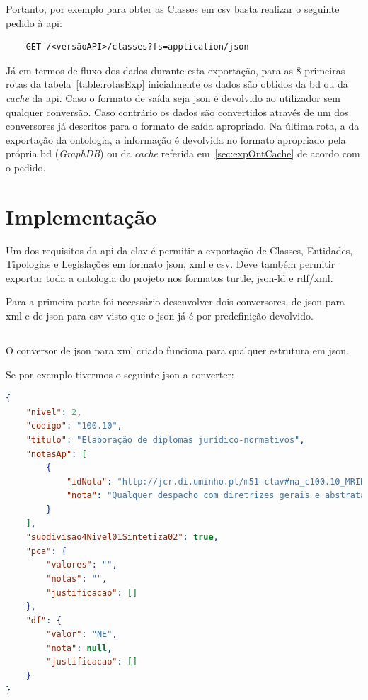 Portanto, por exemplo para obter as Classes em \acrshort{csv} basta realizar o seguinte pedido à \acrshort{api}:
\footnotesize
\begin{verbatim}
    GET /<versãoAPI>/classes?fs=application/json
\end{verbatim}
\normalsize

Já em termos de fluxo dos dados durante esta exportação, para as 8 primeiras rotas da tabela~\ref{table:rotasExp} inicialmente os dados são obtidos da \acrshort{bd} ou da \textit{cache} da \acrshort{api}. Caso o formato de saída seja \acrshort{json} é devolvido ao utilizador sem qualquer conversão. Caso contrário os dados são convertidos através de um dos conversores já descritos para o formato de saída apropriado. Na última rota, a da exportação da ontologia, a informação é devolvida no formato apropriado pela própria \acrshort{bd} (\textit{GraphDB}) ou da \textit{cache} referida em~\ref{sec:expOntCache} de acordo com o pedido.

\section{Implementação}

Um dos requisitos da \acrshort{api} da \acrshort{clav} é permitir a exportação de Classes, Entidades, Tipologias e Legislações em formato \acrshort{json}, \acrshort{xml} e \acrshort{csv}. Deve também permitir exportar toda a ontologia do projeto nos formatos \acrshort{turtle}, \acrshort{json-ld} e \acrshort{rdf}/\acrshort{xml}.

Para a primeira parte foi necessário desenvolver dois conversores, de \acrshort{json} para \acrshort{xml} e de \acrshort{json} para \acrshort{csv} visto que o \acrshort{json} já é por predefinição devolvido.

\subsection{}
O conversor de \acrshort{json} para \acrshort{xml} criado funciona para qualquer estrutura em \acrshort{json}.

Se por exemplo tivermos o seguinte \acrshort{json} a converter:
\begin{lstlisting}[language=json, caption=\acrshort{json} exemplo a converter, label=exem:json]
{
    "nivel": 2,
    "codigo": "100.10",
    "titulo": "Elaboração de diplomas jurídico-normativos",
    "notasAp": [
        {
            "idNota": "http://jcr.di.uminho.pt/m51-clav#na_c100.10_MRIKl-RBu_2sz5u9FzPqH",
            "nota": "Qualquer despacho com diretrizes gerais e abstratas"
        }
    ],
    "subdivisao4Nivel01Sintetiza02": true,
    "pca": {
        "valores": "",
        "notas": "",
        "justificacao": []
    },
    "df": {
        "valor": "NE",
        "nota": null,
        "justificacao": []
    }
}
\end{lstlisting}

